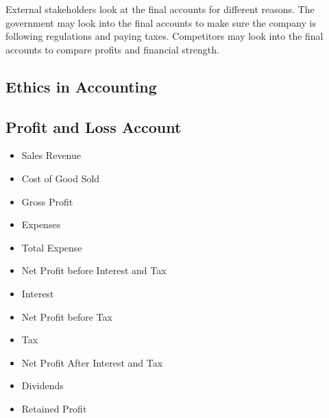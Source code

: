 \documentclass{standalone}
\begin{document}
External stakeholders look at the final accounts for different reasons.
The government may look into the final accounts to make sure the company is following regulations and paying taxes.
Competitors may look into the final accounts to compare profits and financial strength.

\subsection{Ethics in Accounting}

\subsection{Profit and Loss Account}
\begin{itemize}
    \item Sales Revenue
    \item Cost of Good Sold
    \item Gross Profit
    \item Expenses
    \item Total Expense
    \item Net Profit before Interest and Tax
    \item Interest
    \item Net Profit before Tax
    \item Tax
    \item Net Profit After Interest and Tax
    \item Dividends
    \item Retained Profit
\end{itemize}
\end{document}
